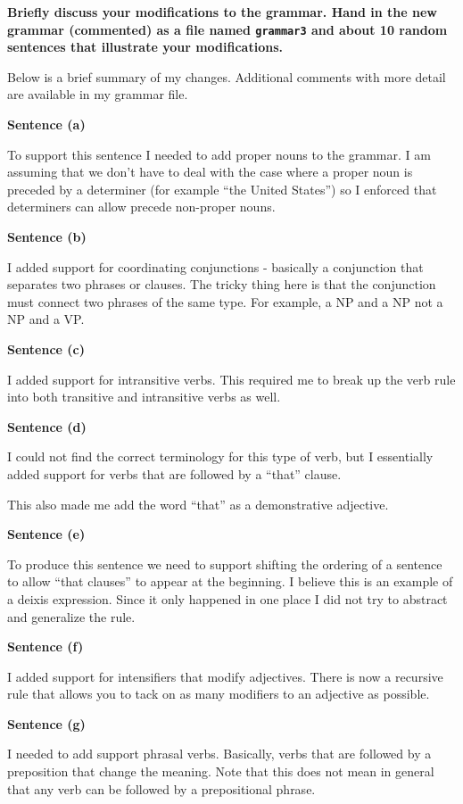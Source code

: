\documentclass[10pt]{article}
\begin{document}
\begin{enumerate}
\noindent
{\bf Briefly discuss your modifications to the grammar. Hand
  in the new grammar (commented) as a file named \verb|grammar3| and about 10
  random sentences that illustrate your modifications.}

Below is a brief summary of my changes. Additional comments with more detail are available in my grammar file.

{\bf Sentence (a)}

To support this sentence I needed to add proper nouns to the grammar. I am assuming that we don't have to deal with the case where a proper noun is preceded by a determiner (for example ``the United States'') so I enforced that determiners can allow precede non-proper nouns.

{\bf Sentence (b)}

I added support for coordinating conjunctions - basically a conjunction that separates two phrases or clauses. The tricky thing here is that the conjunction must connect two phrases of the same type. For example, a NP and a NP not a NP and a VP. 

{\bf Sentence (c)}

I added support for intransitive verbs. This required me to break up the verb rule into both transitive and intransitive verbs as well.

{\bf Sentence (d)}

I could not find the correct terminology for this type of verb, but I essentially added support for verbs that are followed by a ``that'' clause.

This also made me add the word ``that'' as a demonstrative adjective.

{\bf Sentence (e)}

To produce this sentence we need to support shifting the ordering of a sentence to allow ``that clauses'' to appear at the beginning. I believe this is an example of a deixis expression. Since it only happened in one place I did not try to abstract and generalize the rule.

{\bf Sentence (f)}

I added support for intensifiers that modify adjectives. There is now a recursive rule that allows you to tack on as many modifiers to an adjective as possible.

{\bf Sentence (g)}

I needed to add support phrasal verbs. Basically, verbs that are followed by a preposition that change the meaning. Note that this does not mean in general that any verb can be followed by a prepositional phrase.


\end{enumerate}
\end{document}
